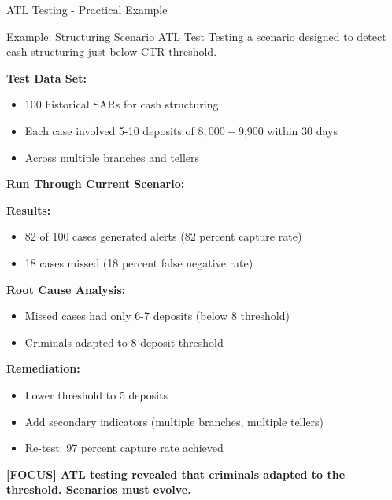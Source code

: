 \documentclass[11pt,a4paper]{beamer}
\newcommand{\examfocus}[1]{\textcolor{orange!80!black}{\textbf{[FOCUS] #1}}}
\begin{document}
	\begin{frame}{ATL Testing - Practical Example}
		\begin{block}{Example: Structuring Scenario ATL Test}
			Testing a scenario designed to detect cash structuring just below CTR threshold.
		\end{block}
		
		\textbf{Test Data Set:}
		\begin{itemize}
			\item 100 historical SARs for cash structuring
			\item Each case involved 5-10 deposits of $8,000-$9,900 within 30 days
			\item Across multiple branches and tellers
		\end{itemize}
		
		\textbf{Run Through Current Scenario:}
		
		\textbf{Results:}
		\begin{itemize}
			\item 82 of 100 cases generated alerts (82 percent capture rate)
			\item 18 cases missed (18 percent false negative rate)
		\end{itemize}
		
		\textbf{Root Cause Analysis:}
		\begin{itemize}
			\item Missed cases had only 6-7 deposits (below 8 threshold)
			\item Criminals adapted to 8-deposit threshold
		\end{itemize}
		
		\textbf{Remediation:}
		\begin{itemize}
			\item Lower threshold to 5 deposits
			\item Add secondary indicators (multiple branches, multiple tellers)
			\item Re-test: 97 percent capture rate achieved
		\end{itemize}
		
		\examfocus{ATL testing revealed that criminals adapted to the threshold. Scenarios must evolve.}
	\end{frame}
	
\end{document}
